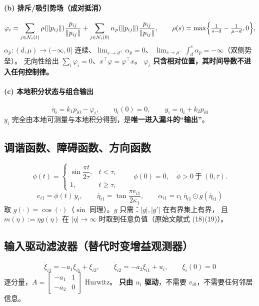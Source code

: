 \documentclass[11pt,a4paper]{article}
\theoremstyle{plain}
\theoremstyle{definition}
\theoremstyle{remark}
\begin{document}
\paragraph{(b) 排斥/吸引势场（成对抵消）}
\begin{equation*}
\varphi_i=\sum_{j\in\mathcal N_i(t)}\rho(\|p_{ij}\|)\frac{p_{ij}}{\|p_{ij}\|}
+\sum_{j\in\mathcal N_i(0)}\alpha_p(\|p_{ij}\|)\frac{p_{ij}}{\|p_{ij}\|},
\qquad
\rho(s)=\max\Bigl\{\tfrac{1}{s-d}-\tfrac{1}{\mu-d},0\Bigr\},
\end{equation*}
$\alpha_p:(d,\mu)\to(-\infty,0]$ 连续、$\lim_{s\to d^+}\alpha_p=0$、
$\lim_{s\to\mu^-}\int_d^s\alpha_p=-\infty$（双侧势垒）。
无向性给出 $\sum_i\varphi_i=0$、$x^\top\varphi=\varphi^\top x$。
\textbf{$\varphi_i$ 只含相对位置，其时间导数不进入任何控制律。}

\paragraph{(c) 本地积分状态与组合输出}
\begin{equation}
\boxed{\ \dot\eta_i=k_1p_{i0}-\varphi_i,\qquad \eta_i(0)=0,\qquad y_i=\eta_i+k_2p_{i0}\ }
\label{eq:eta}\tag{2.1}
\end{equation}
$y_i$ 完全由本地可测量与本地积分得到，是\textbf{唯一进入漏斗的“输出”}。

\subsection{调谐函数、障碍函数、方向函数}
\begin{equation}
\phi(t)=\begin{cases}\sin\dfrac{\pi t}{2\tau},& t<\tau,\\[6pt] 1, & t\ge\tau,\end{cases}
\qquad \phi(0)=0,\quad \dot\phi>0\ \text{于}\ (0,\tau).
\label{eq:phi}\tag{2.2}
\end{equation}
\begin{equation}
\boxed{\ e_{i1}=\phi(t)\,y_i,\qquad
\bar\eta_{i1}=\tan\frac{\pi e_{i1}}{2\kappa_1},\qquad
\alpha_{i1}=c_1\,\bar\eta_{i1}\odot g(\bar\eta_{i1})\ }
\label{eq:alpha}\tag{2.3}
\end{equation}
取 $g(\cdot)=\cos(\cdot)$（$\sin$ 同理）。$g$ 只需：$|g|,|g'|$ 在有界集上有界，
且 $m(\eta):=\eta g(\eta)$ 在 $|\eta|\to\infty$ 时取到任意负值（原始文献式 (18)(19)）。

\subsection{输入驱动滤波器（替代时变增益观测器）}
\begin{equation}
\boxed{\ \dot\xi_{i1}=-a_1\xi_{i1}+\xi_{i2},\qquad
\dot\xi_{i2}=-a_2\xi_{i1}+u_i,\qquad \xi_i(0)=0\ }
\label{eq:xi}\tag{2.4}
\end{equation}
逐分量，$A=\begin{bmatrix}-a_1&1\\-a_2&0\end{bmatrix}$ Hurwitz。
\textbf{只由 $u_i$ 驱动}，不需要 $v_{i0}$，不需要任何邻居信息。
\end{document}
